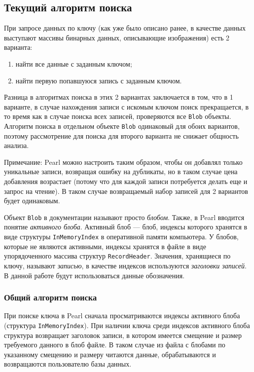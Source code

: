 \clearpage


\subsection{Текущий алгоритм поиска}

При запросе данных по ключу (как уже было описано ранее, в качестве данных выступают массивы бинарных данных, описывающие изображения) есть 2 варианта:
\begin{enumerate}
    \item найти все данные с заданным ключом;
    \item найти первую попавшуюся запись с заданным ключом.
\end{enumerate}

Разница в алгоритмах поиска в этих 2 вариантах заключается в том, что в 1 варианте, в случае нахождения записи с искомым ключом поиск прекращается, в то время как в случае поиска всех записей, проверяются все \texttt{Blob} объекты. Алгоритм поиска в отдельном объекте \texttt{Blob} одинаковый для обоих вариантов, поэтому рассмотрение для поиска для второго варианта не снижает общность анализа.

Примечание: Pearl можно настроить таким образом, чтобы он добавлял только уникальные записи, возвращая ошибку на дубликаты, но в таком случае цена добавления возрастает (потому что для каждой записи потребуется делать еще и запрос на чтение). В таком случае возвращаемый набор записей для 2 вариантов будет одинаковым.

Объект \texttt{Blob} в документации называют просто \textit{блобом}. Также, в Pearl вводится понятие \textit{активного блоба}. Активный блоб --- блоб, индексы которого хранятся в виде структуры \texttt{InMemoryIndex} в оперативной памяти компьютера. У блобов, которые не являются активными, индексы хранятся в файле в виде упорядоченного массива структур \texttt{RecordHeader}. Значения, хранящиеся по ключу, называют \textit{записью}, в качестве индексов используются \textit{заголовки записей}. В данной работе будут использоваться данные обозначения.

\subsubsection{Общий алгоритм поиска}

При поиске ключа в Pearl сначала просматриваются индексы активного блоба (структура \texttt{InMemoryIndex}). При наличии ключа среди индексов активного блоба структура возвращает заголовок записи, в котором имеется смещение и размер требуемого данного в блоб файле. В таком случае из файла с блобами по указанному смещению и размеру читаются данные, обрабатываются и возвращаются пользователю базы данных.


